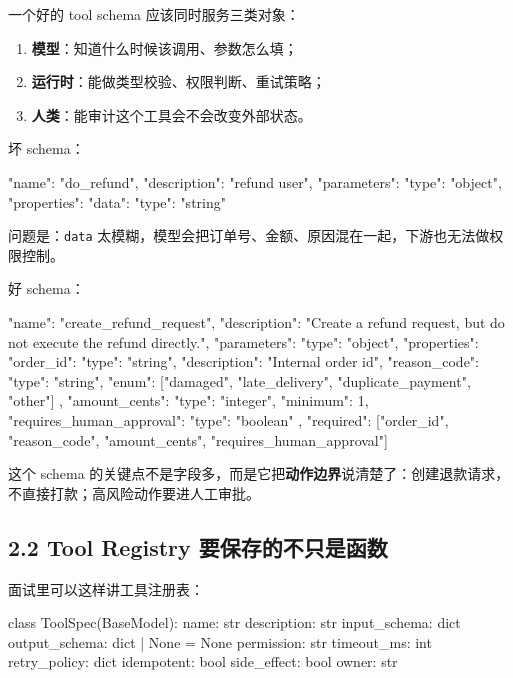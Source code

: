 一个好的 tool schema 应该同时服务三类对象：


\begin{enumerate}[leftmargin=2em]
\item \textbf{模型}：知道什么时候该调用、参数怎么填；
\item \textbf{运行时}：能做类型校验、权限判断、重试策略；
\item \textbf{人类}：能审计这个工具会不会改变外部状态。
\end{enumerate}

坏 schema：


\begin{codeblock}
{
  "name": "do_refund",
  "description": "refund user",
  "parameters": {
    "type": "object",
    "properties": {
      "data": {"type": "string"}
    }
  }
}
\end{codeblock}

问题是：\texttt{data} 太模糊，模型会把订单号、金额、原因混在一起，下游也无法做权限控制。


好 schema：


\begin{codeblock}
{
  "name": "create_refund_request",
  "description": "Create a refund request, but do not execute the refund directly.",
  "parameters": {
    "type": "object",
    "properties": {
      "order_id": {"type": "string", "description": "Internal order id"},
      "reason_code": {
        "type": "string",
        "enum": ["damaged", "late_delivery", "duplicate_payment", "other"]
      },
      "amount_cents": {"type": "integer", "minimum": 1},
      "requires_human_approval": {"type": "boolean"}
    },
    "required": ["order_id", "reason_code", "amount_cents", "requires_human_approval"]
  }
}
\end{codeblock}

这个 schema 的关键点不是字段多，而是它把\textbf{动作边界}说清楚了：创建退款请求，不直接打款；高风险动作要进人工审批。


\subsection{2.2 Tool Registry 要保存的不只是函数}

面试里可以这样讲工具注册表：


\begin{codeblock}
class ToolSpec(BaseModel):
    name: str
    description: str
    input_schema: dict
    output_schema: dict | None = None
    permission: str
    timeout_ms: int
    retry_policy: dict
    idempotent: bool
    side_effect: bool
    owner: str
\end{codeblock}

